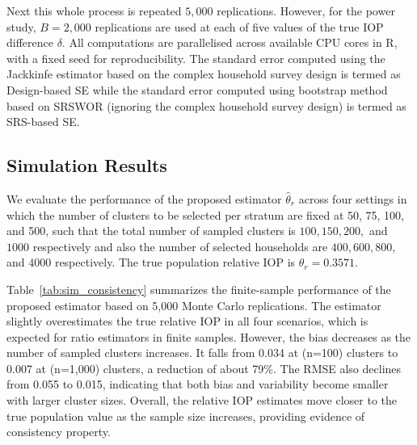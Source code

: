 \documentclass[12pt]{article}
\theoremstyle{plain}
\theoremstyle{definition}
\begin{document}
Next this whole process is repeated $5{,}000$ replications. However, for the power study, $B = 2{,}000$ replications are used at each of five
values of the true IOP difference $\delta$. All computations are parallelised across available CPU cores in \textsf{R}, with a fixed seed for reproducibility. The standard error computed using the Jackkinfe estimator based on the complex household survey design is termed as Design-based SE while the standard error computed using bootstrap method based on SRSWOR (ignoring the complex household survey design) is termed as SRS-based SE. 

\subsection{Simulation Results}
\label{subsec:sim_results}
We evaluate the performance of the proposed estimator $\hat{\theta}_r$ across four settings in which the number of clusters to be selected per stratum are fixed at 50, 75, 100, and 500, such that the total number of sampled clusters is $100, 150, 200,$ and $1000$ respectively and also the number of selected households are $400, 600, 800$, and $4000$ respectively. The true population relative IOP is $\theta_r = 0.3571$.

Table~\ref{tab:sim_consistency} summarizes the finite-sample performance of the proposed estimator based on 5,000 Monte Carlo replications. The estimator slightly overestimates the true relative IOP in all four scenarios, which is expected for ratio estimators in finite samples. However, the bias decreases as the number of sampled clusters increases. It falls from 0.034 at (n=100) clusters to 0.007 at (n=1,000) clusters, a reduction of about 79\%. The RMSE also declines from 0.055 to 0.015, indicating that both bias and variability become smaller with larger cluster sizes. Overall, the relative IOP estimates move closer to the true population value as the sample size increases, providing evidence of consistency property.
\end{document}

